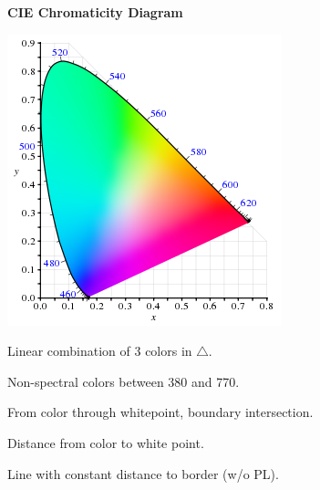\pagebreak
\textbf{CIE Chromaticity Diagram}
\vspace{-10pt}
\begin{multicols}{2}
  \includegraphics*[width=\linewidth]{assets/chromaticity.png}
  
  \begin{definition}
     Linear combination of 3 colors in \(\triangle\).
  \end{definition}

  \begin{definition}
    Non-spectral colors between 380 and 770.
  \end{definition}

  \begin{definition}
    From color through whitepoint, boundary intersection.
  \end{definition}

  \begin{definition}[Saturation]
    Distance from color to white point.
  \end{definition}

  \begin{definition}[Isoline]
    Line with constant distance to border (w/o PL).
  \end{definition}
\end{multicols}

